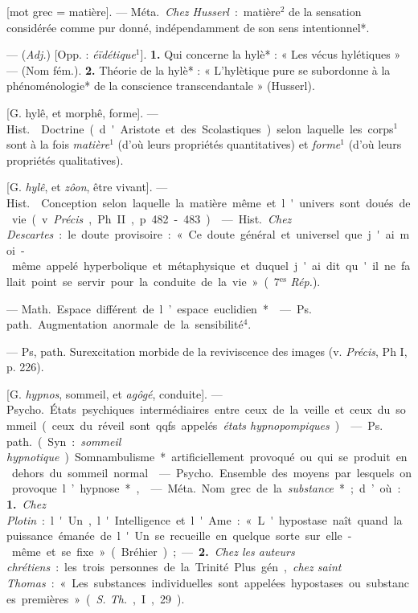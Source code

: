 \begin{itemize}[leftmargin=1cm, label=, itemsep=1pt]
 [mot grec = matière]. — \si{Méta.}
{\it Chez Husserl} : matière$^2$ de la sensation considérée comme pur donné,
indépendamment de son sens intentionnel*.

 — ({\it Adj.}) [Opp. : {\it éïdétique}$^1$]. {\bf 1.} Qui concerne
la hylè* : « Les vécus hylétiques » — (Nom fém.). {\bf 2.} Théorie de la
hylè* : « L’hylètique pure se subordonne à la phénoménologie* de la
conscience transcendantale » (Husserl).

 [G. hylê, et morphê, forme]. — \si{Hist.} 
Doctrine (d'Aristote et des Scolastiques) selon laquelle les corps$^1$ sont à
la fois {\it matière}$^1$ (d’où leurs propriétés quantitatives) et
{\it forme}$^1$ (d’où leurs propriétés qualitatives).

 [G. {\it hylê}, et {\it zôon}, être vivant]. — \si{Hist.}
 Conception selon laquelle la matière même et l'univers sont
doués de vie (v. {\it Précis}, Ph. II, p. 482-483).

 — \si{Hist.} {\it Chez Descartes} : le doute
provisoire : « Ce doute général et universel que j'ai moi-même appelé
hyperbolique et métaphysique et duquel j'ai dit qu'il ne fallait point se
servir pour... la conduite de la vie » (7$^\text{es}$ {\it Rép.}).

 — \si{Math.} Espace différent de l’espace euclidien*.

 — \si{Ps. path.} Augmentation anormale de la 
sensibilité$^4$.

 — Ps, path. Surexcitation morbide de la reviviscence
des images (v. {\it Précis}, Ph I, p. 226).

 [G. {\it hypnos}, sommeil, et {\it agôgé},
conduite]. — \si{Psycho.} États psychiques intermédiaires entre ceux de la
veille et ceux du sommeil (ceux du réveil sont qqfs. appelés {\it états
hypnopompiques}).

 — \si{Ps. path.} (Syn. : {\it sommeil hypnotique}).
Somnambulisme* artificiellement provoqué ou qui se produit en dehors du
sommeil normal.

 — \si{Psycho.} Ensemble
des moyens par lesquels on provoque l’hypnose*,

 — \si{Méta.} Nom grec de la {\it substance}* ; d’où : {\bf 1.}
{\it Chez Plotin} : l'Un, l'Intelligence et l'Ame : « L'hypostase naît quand
la puissance émanée de l'Un se recueille en quelque sorte sur elle-même et se
fixe » (Bréhier) ; — {\bf 2.} {\it Chez les auteurs chrétiens} : les trois
personnes de la Trinité. Plus gén., {\it chez saint Thomas} : « Les
substances individuelles sont appelées hypostases ou substances
premières » ({\it S. Th.}, I, 29).


\end{itemize}
